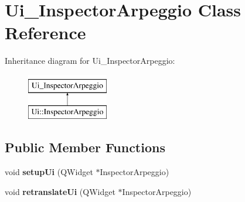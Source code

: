 \hypertarget{class_ui___inspector_arpeggio}{}\section{Ui\+\_\+\+Inspector\+Arpeggio Class Reference}
\label{class_ui___inspector_arpeggio}
Inheritance diagram for Ui\+\_\+\+Inspector\+Arpeggio\+:\begin{figure}[H]
\begin{center}
\leavevmode
\includegraphics[height=2.000000cm]{class_ui___inspector_arpeggio}
\end{center}
\end{figure}
\subsection*{Public Member Functions}
\begin{DoxyCompactItemize}
\item 
\mbox{\label{class_ui___inspector_arpeggio_ab19ade7dc9374f4b372d8353a28493d8}} 
void {\bfseries setup\+Ui} (Q\+Widget $\ast$Inspector\+Arpeggio)
\item 
\mbox{\label{class_ui___inspector_arpeggio_a68fdf27309d74416b23acca853ac6761}} 
void {\bfseries retranslate\+Ui} (Q\+Widget $\ast$Inspector\+Arpeggio)
\end{DoxyCompactItemize}

